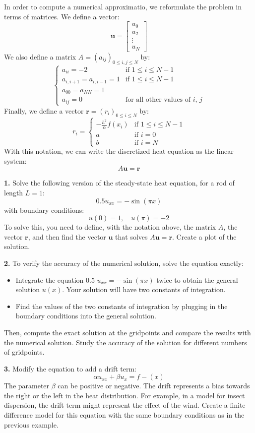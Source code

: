 \documentclass[12pt]{article}
\begin{document}
In order to compute a numerical approximatio, we reformulate the problem in terms of matrices. We define a vector:
$$
\mathbf{u}=\left[\begin{matrix}u_0 \\ u_2 \\ \vdots \\ u_N\end{matrix}\right]
$$
We also define a matrix $A=(a_{ij})_{0\le i,j\le N}$ by:
$$
\begin{cases}
a_{ii}=-2 & \text{if $1\le i\le N-1$}\\
a_{i,i+1}=a_{i,i-1}=1 & \text{if $1\le i\le N-1$}\\
a_{00}=a_{NN}=1\\
a_{ij}=0 & \text{for all other values of $i$, $j$}
\end{cases}
$$
Finally, we define a vector $\mathbf{r}=(r_i)_{0\le i\le N}$ by:
$$
r_i=
\begin{cases}
-\frac{h^2}{\alpha}f(x_i) & \text{if $1\le i\le N-1$}\\
a & \text{if $i=0$}\\
b & \text{if $i=N$}
\end{cases}
$$
With this notation, we can write the discretized heat equation as the linear system:
$$
A\mathbf{u}=\mathbf{r}
$$

\textbf{1.} Solve the following version of the steady-state heat equation, for a rod of length $L=1$:
$$
0.5 u_{xx}=-\sin(\pi x)
$$
with boundary conditions:
$$
u(0)=1,\quad u(\pi)=-2
$$
To solve this, you need to define, with the notation above, the matrix $A$, the vector $\mathbf{r}$, and then find the vector $\mathbf{u}$ that solves $A\mathbf{u}=\mathbf{r}$. Create a plot of the solution.

\textbf{2.} To verify the accuracy of the numerical solution, solve the equation exactly:
\begin{itemize}
\item Integrate the equation 0.5 $u_{xx}=-\sin(\pi x)$ twice to obtain the general solution $u(x)$. Your solution will have two constants of integration.
\item Find the values of the two constants of integration by plugging in the boundary conditions into the general solution.
\end{itemize}
Then, compute the exact solution at the gridpoints and compare the results with the numerical solution. Study the accuracy of the solution for different numbers of gridpoints.

\textbf{3.} Modify the equation to add a drift term:
\[
\alpha u_{xx}+\beta u_x=f-(x)
\]
The parameter $\beta$ can be positive or negative. The drift represents a bias towards the right or the left in the heat distribution. For example, in a model for insect dispersion, the drift term might represent the effect of the wind. Create a finite difference model for this equation with the same boundary conditions as in the previous example.
\end{document}
